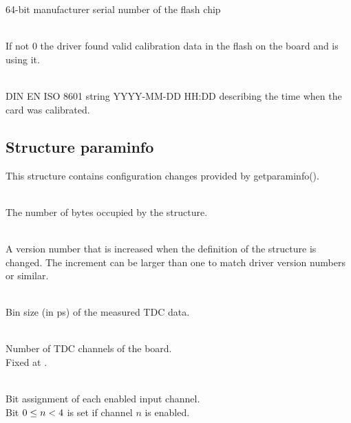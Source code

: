 \\
\\
64-bit manufacturer serial number of the flash chip

\\
If not 0 the driver found valid calibration data in the flash on the board and is using it.\par

\\
DIN EN ISO 8601 string YYYY-MM-DD HH:DD describing the time when the card was calibrated.


\subsection{Structure \prefix param\tu info}
This structure contains configuration changes provided by \textsf{\prefix get\tu param\tu info()}.

\\
The number of bytes occupied by the structure. \par

\\
A version number that is increased when the definition of the structure is changed. The increment can be larger than one to match driver version numbers or similar.\par


\\
Bin size (in ps) of the measured TDC data.


\\
Number of TDC channels of the board.\\
Fixed at .\par

\\
Bit assignment of each enabled input channel.\\
Bit $0 \leq n < \ifxHPTDC{8}{4}$ is set if channel $n$ is enabled. \par

